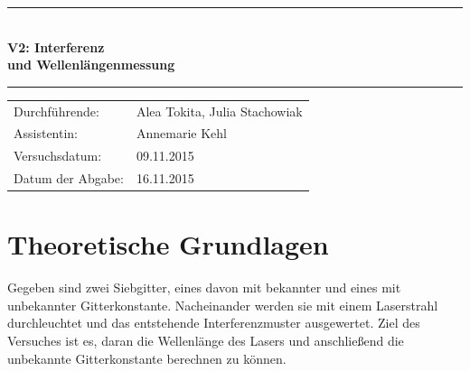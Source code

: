\documentclass[12pt,a4paper,titlepage,headinclude,bibtotoc]{scrartcl}
\begin{document}
\begin{titlepage}
\centering

\vspace*{3cm}

\rule{\textwidth}{1pt}\\[0.5cm]
{\huge \bfseries
  V2: Interferenz\\[1.5ex]
  und Wellenlängenmessung}\\[0.5cm]
\rule{\textwidth}{1pt}

\vspace*{3cm}


\begin{Large}
\begin{tabular}{ll}
Durchführende: &  Alea Tokita, Julia Stachowiak\\
Assistentin: & Annemarie Kehl\\
 Versuchsdatum: & 09.11.2015\\
 Datum der Abgabe: & 16.11.2015\\
\end{tabular}
\end{Large}

\vspace*{2.5cm}

\begin{Large}
\end{Large}

\end{titlepage}

\tableofcontents

\newpage

\section{Theoretische Grundlagen}
Gegeben sind zwei Siebgitter, eines davon mit bekannter und eines mit unbekannter Gitterkonstante. Nacheinander werden sie mit einem Laserstrahl durchleuchtet und das entstehende Interferenzmuster ausgewertet. Ziel des Versuches ist es, daran die Wellenlänge des Lasers und anschließend die unbekannte Gitterkonstante berechnen zu können.
\end{document}
